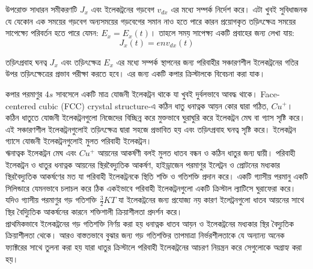 \documentclass{article}
\begin{document}
উপরোক্ত সাধারন সমীকরণটি $ J_{x} $ এবং ইলেকট্রনের গড়বেগ $  v_{dx} $ এর মধ্যে সম্পর্ক নির্দেশ করে। এটা খুবই সুবিধাজনক যে যেকোন এক সময়ের গড়বেগ অন্যসময়ের গড়বেগের সমান নাও হতে পারে কারন প্রয়োগকৃত তড়িৎক্ষেত্র সময়ের সাপেক্ষ্যে পরিবর্তন হতে পারে যেমন: $ E_{x} = E_{x}(t) $।  তাহলে সময় সাপেক্ষ্য একটি প্রবাহের জন্য লেখা যায়: \[ J_{x} (t)= env_{dx}(t)\]

তড়িৎপ্রবাহ ঘনত্ব $ J_{x} $ এবং তড়িৎক্ষেত্র $ E_{x} $ এর মধ্যে সম্পর্ক স্থাপনের জন্য পরিবাহীর সঞ্চারণশীল ইলেকট্রনের গতির উপর তড়িৎক্ষেত্রের প্রভাব পরীক্ষা করতে হবে। এর জন্য একটি কপার ক্রিস্টালকে বিবেচনা করা যাক।

কপার পরমাণুর $ 4s $ সাবসেলে একটি মাত্র যোজনী ইলেকট্রন থাকে যা খুবই দুর্বলভাবে আবদ্ধ থাকে। Face-centered cubic (FCC) crystal structure-এ কঠিন ধাতু ধনাত্নক আয়ন কোর দ্বারা গঠিত, $ Cu^{+} $। কঠিন ধাতুতে যোজনী ইলেকট্রনগুলো নিজেদের বিচ্ছিন্ন করে মুক্তভাবে ঘুরাঘুরি করে ইলেকট্রন মেঘ বা গ্যাস সৃষ্টি করে। এই সঞ্চারণশীল ইলেকট্রনগুলোই তড়িৎক্ষেত্র দ্বারা সহজে প্রভাবিত হয় এবং তড়িৎপ্রবাহ ঘনত্ব সৃষ্টি করে। ইলেকট্রন গ্যাসে যোজনী ইলেকট্রনগুলোই মুলত পরিবাহী ইলেকট্রন।\\

ঋনাত্বক ইলেকট্রন মেঘ এবং $ Cu^{+} $ আয়নের আকর্ষণী বলই মুলত ধাতব বন্ধন ও কঠিন ধাতুর জন্য দ্বায়ী। পরিবাহী ইলেকট্রন ও ধাতুর ধনাত্নক আয়নের স্থিরবৈদ্যুতিক আকর্ষণ, হাইড্রাজেন পরমাণুর ইলেট্রন ও প্রোটনের মধ্যকার স্থিরবৈদ্যুতিক আকর্ষণের মত যা পরিবাহী ইলেকট্রনকে স্থিতি শক্তি ও গতিশক্তি প্রদান করে। একটি গ্যাসীয় পরমানু একটি সিলিন্ডারে যেমনভাবে চলাচল করে ঠিক একইভাবে পরিবাহী ইলেকট্রনগুলো একটি ক্রিস্টাল ল্যাটিসে ঘুরাফেরা করে। যদিও গ্যাসীয় পরমাণুর গড় গতিশক্তি $ \frac{3}{2}KT $ যা ইলেকট্রনের জন্য প্রযোজ্য নয় কারণ ইলেট্রনগুলো ধাতব আয়নের সাথে স্থির বৈদ্যিুতিক আকর্ষনের কারনে শক্তিশালী ক্রিয়াশীলতা প্রদর্শন করে।\\

প্রাথমিকভাবে ইলেকট্রনের গড় গতিশক্তি নির্ণয় করা হয় ধনাত্নক ধাতব আয়ন ও ইলেকট্রনের মধ্যকার স্থির বৈদ্যুতিক ক্রিয়াশীলতা থেকে। আরও বাস্ততভাবে বুঝার জন্য গড় গতিশক্তির তাপমাত্রা নির্ভরশীলতাকে যে অন্যান্য অনেক ফ্যাক্টরের সাথে তুলনা করা হয় যারা ধাতুর ক্রিস্টালে পরিবাহী ইলেকট্রনের আচরণ নিয়ন্ত্রন করে সেগুলোকে অগ্রাহ্য করা হয়।
\end{document}
